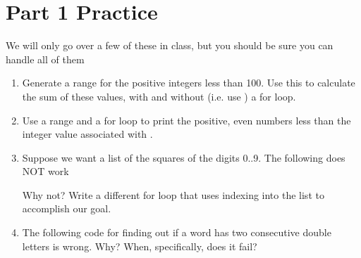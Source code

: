 \documentclass[letterpaper,10pt,english]{sphinxmanual}
\begin{document}
\section{Part 1 Practice}
\label{\detokenize{lecture_notes/lec12_loops2_for_double:part-1-practice}}
We will only go over a few of these in class, but you should be sure
you can handle all of them
\begin{enumerate}
\item {} 
Generate a range for the positive integers less than 100. Use this to
calculate the sum of these values, with and without (i.e. use
) a for loop.

\item {} 
Use a range and a for loop to print the positive, even numbers less than the
integer value associated with .

\item {} 
Suppose we want a list of the squares of the digits 0..9. The
following does NOT work

%
\begin{sphinxVerbatim}[commandchars=\\\{\}]
  
   
      
\end{sphinxVerbatim}

Why not? Write a different for loop that uses indexing into the
 list to accomplish our goal.

\item {} 
The following code for finding out if a word has two consecutive
double letters is wrong. Why? When, specifically, does it fail?

%
\begin{sphinxVerbatim}[commandchars=\\\{\}]
 
        
         \PYG{p}{[}\PYG{p}{]}  \PYG{p}{[}\PYG{p}{]}  \PYG{p}{[}\PYG{p}{]}  \PYG{p}{[}\PYG{p}{]}
             
     
\end{sphinxVerbatim}

\end{enumerate}
\end{document}
